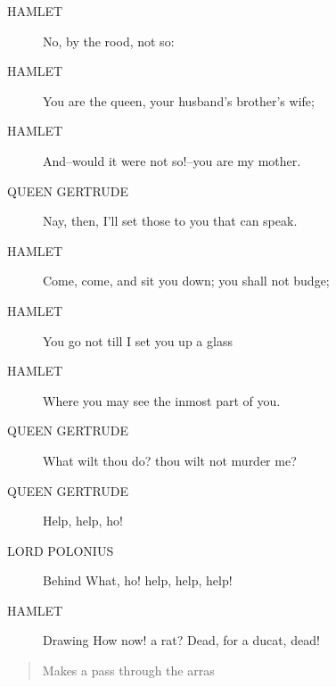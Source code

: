\documentclass{article}
\begin{document}
\begin{description}
            
\item[HAMLET] No, by the rood, not so:
\item[HAMLET] You are the queen, your husband's brother's wife;
\item[HAMLET] And--would it were not so!--you are my mother.
\end{description}
          
\begin{description}
            
\item[QUEEN GERTRUDE] Nay, then, I'll set those to you that can speak.
\end{description}
          
\begin{description}
            
\item[HAMLET] Come, come, and sit you down; you shall not budge;
\item[HAMLET] You go not till I set you up a glass
\item[HAMLET] Where you may see the inmost part of you.
\end{description}
          
\begin{description}
            
\item[QUEEN GERTRUDE] What wilt thou do? thou wilt not murder me?
\item[QUEEN GERTRUDE] Help, help, ho!
\end{description}
          
\begin{description}
            
\item[LORD POLONIUS] 
               Behind  What, ho! help, help, help!
\end{description}
          
\begin{description}
            
\item[HAMLET] 
               Drawing  How now! a rat? Dead, for a ducat, dead!
\end{description}
          
\begin{quote}
Makes a pass through the arras
\end{quote}
          
\end{document}
